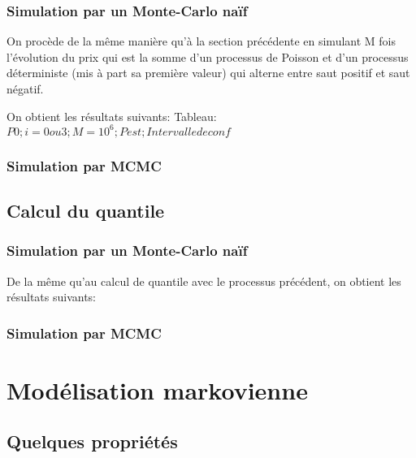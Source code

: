\documentclass[a4paper,11pt]{article}
\begin{document}
\subsubsection{Simulation par un Monte-Carlo naïf}
On procède de la même manière qu'à la section précédente en simulant M fois l'évolution du prix qui est la somme d'un processus de Poisson et d'un processus déterministe (mis à part sa première valeur) qui alterne entre saut positif et saut négatif. 

On obtient les résultats suivants:
Tableau: $P0; i=0 ou 3 ;M=10^6; Pest; Intervalle de conf$

\subsubsection{Simulation par MCMC}

\subsection{Calcul du quantile}

\subsubsection{Simulation par un Monte-Carlo naïf}
De la même qu'au calcul de quantile avec le processus précédent, on obtient les résultats suivants:

\subsubsection{Simulation par MCMC}

\section{Modélisation markovienne}

\subsection{Quelques propriétés}
\end{document}
